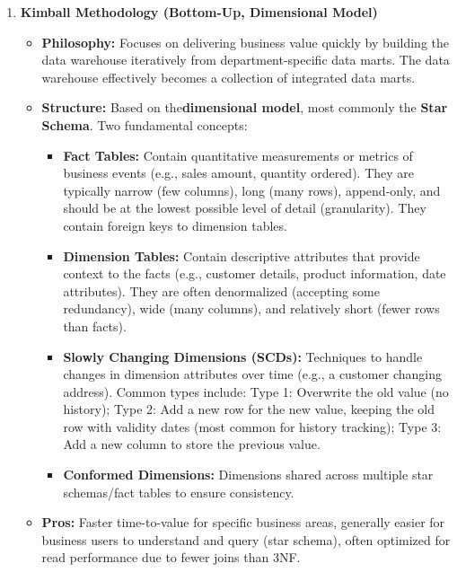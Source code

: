 \begin{enumerate}
    \item \textbf{Kimball Methodology (Bottom-Up, Dimensional Model)}
    \begin{itemize}
        \item \textbf{Philosophy:} Focuses on delivering business value
        quickly by building the data warehouse iteratively from
        department-specific data marts. The data warehouse effectively
        becomes a collection of integrated data marts.

        \item \textbf{Structure:} Based on the\textbf{dimensional model},
        most commonly the \textbf{Star Schema}. Two fundamental concepts:
        \begin{itemize}
            \item \textbf{Fact Tables:}
            Contain quantitative measurements or metrics of business events
            (e.g., sales amount, quantity ordered). They are typically narrow
            (few columns), long (many rows), append-only, and should be at the
            lowest possible level of detail (granularity). They contain foreign
            keys to dimension tables.

            \item \textbf{Dimension Tables:}
            Contain descriptive attributes that provide context to the facts
            (e.g., customer details, product information, date attributes).
            They are often denormalized (accepting some redundancy), wide
            (many columns), and relatively short (fewer rows than facts).


            \item \textbf{Slowly Changing Dimensions (SCDs):}
            Techniques to handle changes in dimension attributes over time
            (e.g., a customer changing address). Common types include:
            Type 1: Overwrite the old value (no history);
            Type 2: Add a new row for the new value, keeping the
            old row with validity dates (most common for history tracking);
            Type 3: Add a new column to store the previous value.

            \item \textbf{Conformed Dimensions:}
            Dimensions shared across multiple star schemas/fact tables to
            ensure consistency.

        \end{itemize}

        \item \textbf{Pros:} Faster time-to-value for specific business areas,
        generally easier for business users to understand and query
        (star schema), often optimized for read performance due to fewer
        joins than 3NF.


\end{itemize}
\end{enumerate}

